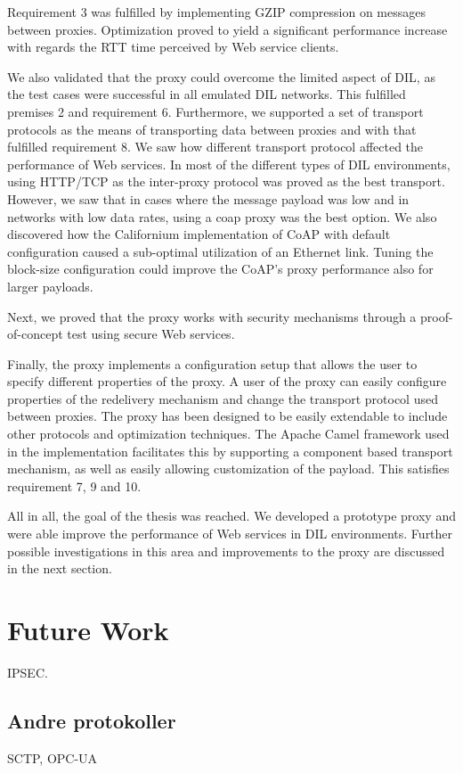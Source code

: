 Requirement 3 was fulfilled by implementing GZIP compression on messages between
proxies. Optimization proved to yield a significant performance increase with
regards the RTT time perceived by Web service clients.

We also validated that the proxy could overcome the limited aspect of DIL, as
the test cases were successful in all emulated DIL networks. This fulfilled
premises 2 and requirement 6. Furthermore, we supported a set of transport
protocols as the means of transporting data between proxies and with that
fulfilled requirement 8. We saw how different transport protocol affected the
performance of Web services. In most of the different types of DIL environments,
using HTTP/TCP as the inter-proxy protocol was proved as the best transport.
However, we saw that in cases where the message payload was low and in networks
with low data rates, using a \gls{coap} proxy was the best option. We also discovered
how the Californium implementation of CoAP with default configuration caused a
sub-optimal utilization of an Ethernet link. Tuning the block-size configuration
could improve the CoAP's proxy performance also for larger payloads.

Next, we proved that the proxy works with security mechanisms through a
proof-of-concept test using secure Web services.

Finally, the proxy implements a configuration setup that allows the user to
specify different properties of the proxy. A user of the proxy can easily
configure properties of the redelivery mechanism and change the transport
protocol used between proxies. The proxy has been designed to be easily
extendable to include other protocols and optimization techniques. The Apache
Camel framework used in the implementation facilitates this by supporting a
component based transport mechanism, as well as easily allowing customization of
the payload. This satisfies requirement 7, 9 and 10.


All in all, the goal of the thesis was reached. We developed a prototype proxy
and were able improve the performance of Web services in DIL environments.
Further possible investigations in this area and improvements to the proxy are
discussed in the next section.


\section{Future Work}
IPSEC.

\subsection{Andre protokoller}
SCTP, OPC-UA

